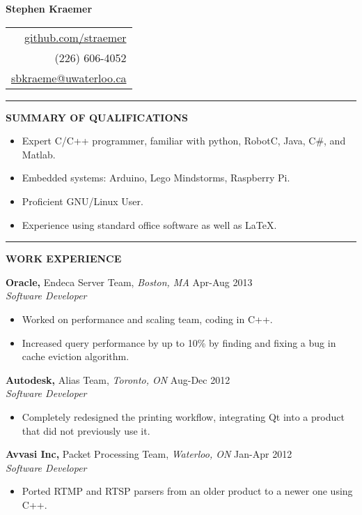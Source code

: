 \documentclass{letter}
\begin{document}
{\Huge\bf Stephen Kraemer} \hfill
\begin{tabular}{r}
  \href{https://github.com/straemer}{github.com/straemer} \\
  (226) 606-4052 \\
  \href{mailto:sbkraeme@uwaterloo.ca}{sbkraeme@uwaterloo.ca}
\end{tabular}

\vskip 2pt
\hrule

{\large\bf SUMMARY OF QUALIFICATIONS}

\begin{itemize}
  \item Expert C/C++ programmer, familiar with python, RobotC, Java, C\#, and Matlab.
  \item Embedded systems: Arduino, Lego Mindstorms, Raspberry Pi.
  \item Proficient GNU/Linux User.
  \item Experience using standard office software as well as LaTeX.
\end{itemize}

\vskip 2pt
\hrule
{\large\bf WORK EXPERIENCE}

{\bf Oracle,} Endeca Server Team, {\sl Boston, MA} \hfill Apr-Aug 2013 \\
{\sl Software Developer}
\begin{itemize}
  \item Worked on performance and scaling team, coding in C++.
  \item Increased query performance by up to 10\% by finding and fixing a bug in cache eviction algorithm.
\end{itemize}

{\bf Autodesk,} Alias Team, {\sl Toronto, ON} \hfill Aug-Dec 2012 \\
{\sl Software Developer}
\begin{itemize}
  \item Completely redesigned the printing workflow, integrating Qt into a product that did not previously use it.
\end{itemize}

{\bf Avvasi Inc,} Packet Processing Team, {\sl Waterloo, ON} \hfill Jan-Apr 2012 \\
{\sl Software Developer}
\begin{itemize}
  \item Ported RTMP and RTSP parsers from an older product to a newer one using C++.
\end{itemize}
\end{document}
